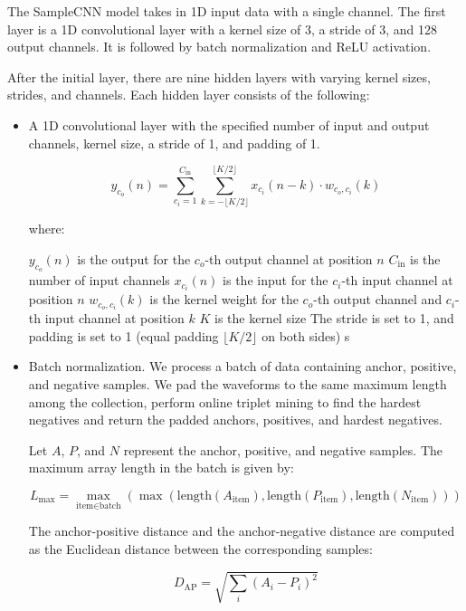 The SampleCNN model \cite{CLMR2021} takes in 1D input data with a single channel. The first layer is a 1D convolutional layer with a kernel size of 3, a stride of 3, and 128 output channels. It is followed by batch normalization and ReLU activation.

After the initial layer, there are nine hidden layers with varying kernel sizes, strides, and channels. Each hidden layer consists of the following:

\begin{itemize}
    \item A 1D convolutional layer with the specified number of input and output channels, kernel size, a stride of 1, and padding of 1.

    \begin{equation}
y_{c_o}(n) = \sum_{c_i=1}^{C_{\text{in}}} \sum_{k=-\lfloor K/2 \rfloor}^{\lfloor K/2 \rfloor} x_{c_i}(n - k) \cdot w_{c_o, c_i}(k)
\end{equation}

where:

$y_{c_o}(n)$ is the output for the $c_o$-th output channel at position $n$
$C_{\text{in}}$ is the number of input channels
$x_{c_i}(n)$ is the input for the $c_i$-th input channel at position $n$
$w_{c_o, c_i}(k)$ is the kernel weight for the $c_o$-th output channel and $c_i$-th input channel at position $k$
$K$ is the kernel size
The stride is set to 1, and padding is set to 1 (equal padding $\lfloor K/2 \rfloor$ on both sides)
s
    \item Batch normalization. We process a batch of data containing anchor, positive, and negative samples. We pad the waveforms to the same  maximum length among the collection, perform online triplet mining to find the hardest negatives and return the padded anchors, positives, and hardest negatives.

    Let $A$, $P$, and $N$ represent the anchor, positive, and negative samples. The maximum array length in the batch is given by:

    \begin{equation}
L_{\text{max}} = \max_{\text{item} \in \text{batch}}(\max(\text{length}(A_{\text{item}}), \text{length}(P_{\text{item}}), \text{length}(N_{\text{item}})))
\end{equation}

    The anchor-positive distance and the anchor-negative distance are computed as the Euclidean distance between the corresponding samples:

    \begin{equation}
D_{\text{AP}} = \sqrt{\sum_{i} (A_i - P_i)^2}
\end{equation}


\end{itemize}
